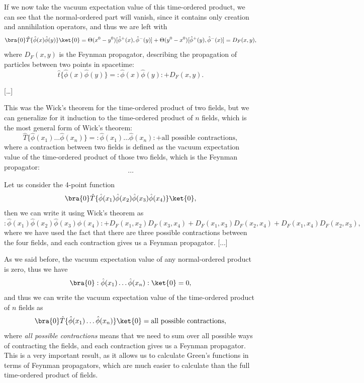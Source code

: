If we now take the vacuum expectation value of this time-ordered product, we can see that the normal-ordered part will vanish, since it contains only creation and annihilation operators, and thus we are left with
\[
    \bra{0} \hat{T} \{ \hat{\phi} (x) \hat{\phi} (y) \} \ket{0} = \Theta(x^0-y^0) [\hat{\phi}^{+} (x), \hat{\phi}^{-} (y)] + \Theta(y^0-x^0) [\hat{\phi}^{+} (y), \hat{\phi}^{-} (x)] = D_F (x,y),
\]
where \(D_F (x,y)\) is the Feynman propagator, describing the propagation of particles between two points in spacetime:
\[
    \hat{t} \{ \hat{\phi} (x) \hat{\phi} (y) \} = : \hat{\phi} (x) \hat{\phi} (y) : + D_F (x,y).
\]

[\dots ]

This was the Wick's theorem for the time-ordered product of two fields, but we can generalize for it induction to the time-ordered product of \(n\) fields, which is the most general form of Wick's theorem:
\[
    \hat{T} \{ \hat{\phi} (x_1) \dots \hat{\phi} (x_n) \} = : \hat{\phi} (x_1) \dots \hat{\phi} (x_n) : + \text{all possible contractions},
\]
where a contraction between two fields is defined as the vacuum expectation value of the time-ordered product of those two fields, which is the Feynman propagator:
\[
    \dots
\]

\begin{example}
    Let us consider the 4-point function
    \[
        \bra{0} \hat{T} \{ \hat{\phi} (x_1) \hat{\phi} (x_2) \hat{\phi} (x_3) \hat{\phi} (x_4) \} \ket{0},
    \]
    then we can write it using Wick's theorem as
    \[
        :\hat{\phi} (x_1) \hat{\phi} (x_2) \hat{\phi} (x_3) \hat{\phi} (x_4): + D_F(x_1,x_2) D_F(x_3,x_4) + D_F(x_1,x_3) D_F(x_2,x_4) + D_F(x_1,x_4) D_F(x_2,x_3),
    \]
    where we have used the fact that there are three possible contractions between the four fields, and each contraction gives us a Feynman propagator.
        [...]

\end{example}

\begin{corollary}
    As we said before, the vacuum expectation value of any normal-ordered product is zero, thus we have
    \[
        \bra{0} : \hat{\phi} (x_1) \dots \hat{\phi} (x_n) : \ket{0} = 0,
    \]
    and thus we can write the vacuum expectation value of the time-ordered product of \(n\) fields as
    \[
        \bra{0} \hat{T} \{ \hat{\phi} (x_1) \dots \hat{\phi} (x_n) \} \ket{0} = \text{all possible contractions},
    \]
    where \textit{all possible contractions} means that we need to sum over all possible ways of contracting the fields, and each contraction gives us a Feynman propagator. This is a very important result, as it allows us to calculate Green's functions in terms of Feynman propagators, which are much easier to calculate than the full time-ordered product of fields.
\end{corollary}

